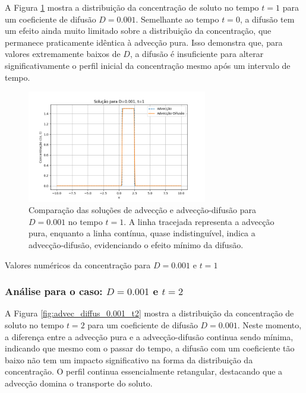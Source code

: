 A Figura \ref{fig:advec_diffus_0.001_t1} mostra a distribuição da concentração de soluto no tempo \( t = 1 \) para um coeficiente de difusão \( D = 0.001 \). Semelhante ao tempo \( t = 0 \), a difusão tem um efeito ainda muito limitado sobre a distribuição da concentração, que permanece praticamente idêntica à advecção pura. Isso demonstra que, para valores extremamente baixos de \( D \), a difusão é insuficiente para alterar significativamente o perfil inicial da concentração mesmo após um intervalo de tempo.

\begin{figure}[H]
    \centering
    \includegraphics[width=0.7\textwidth]{code/plot/Advec_Difus_t1_D0.001.png}
    \caption{Comparação das soluções de advecção e advecção-difusão para \( D = 0.001 \) no tempo \( t = 1 \). A linha tracejada representa a advecção pura, enquanto a linha contínua, quase indistinguível, indica a advecção-difusão, evidenciando o efeito mínimo da difusão.}
    \label{fig:advec_diffus_0.001_t1}
\end{figure}

\begin{table}[H]
    \centering
    \caption{Valores numéricos da concentração para \( D = 0.001 \) e \( t = 1 \)}
    
\end{table}


\subsubsection{Análise para o caso: \( D = 0.001 \) e \( t = 2 \)}

A Figura \ref{fig:advec_diffus_0.001_t2} mostra a distribuição da concentração de soluto no tempo \( t = 2 \) para um coeficiente de difusão \( D = 0.001 \). Neste momento, a diferença entre a advecção pura e a advecção-difusão continua sendo mínima, indicando que mesmo com o passar do tempo, a difusão com um coeficiente tão baixo não tem um impacto significativo na forma da distribuição da concentração. O perfil continua essencialmente retangular, destacando que a advecção domina o transporte do soluto.

